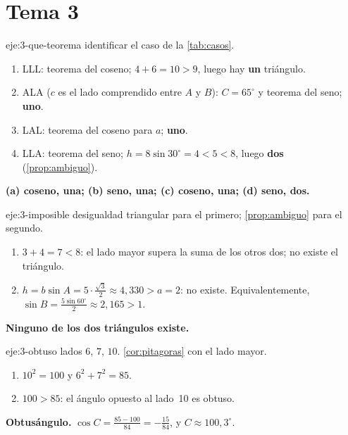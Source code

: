 \section{Tema 3}

\begin{solucion}{eje:3-que-teorema}
\planteamiento identificar el caso de la \cref{tab:casos}.
\pasos
\begin{enumerate}[label=(\alph*)]
  \item LLL: teorema del coseno; $4+6=10>9$, luego hay \textbf{un} triángulo.
  \item ALA ($c$ es el lado comprendido entre $A$ y $B$): $C=65^{\circ}$ y teorema del seno; \textbf{uno}.
  \item LAL: teorema del coseno para $a$; \textbf{uno}.
  \item LLA: teorema del seno; $h=8\sin30^{\circ}=4<5<8$, luego \textbf{dos} (\cref{prop:ambiguo}).
\end{enumerate}
\resultado \textbf{(a) coseno, una; (b) seno, una; (c) coseno, una; (d) seno, dos.}
\end{solucion}

\begin{solucion}{eje:3-imposible}
\planteamiento desigualdad triangular para el primero; \cref{prop:ambiguo} para el segundo.
\pasos
\begin{enumerate}[label=\arabic*.]
  \item $3+4=7<8$: el lado mayor supera la suma de los otros dos; no existe el triángulo.
  \item $h=b\sin A=5\cdot\frac{\sqrt3}{2}\approx4{,}330>a=2$: no existe. Equivalentemente, $\sin B=\frac{5\sin60^{\circ}}{2}\approx2{,}165>1$.
\end{enumerate}
\resultado \textbf{Ninguno de los dos triángulos existe.}
\end{solucion}

\begin{solucion}{eje:3-obtuso}
\datos lados $6$, $7$, $10$.
\planteamiento \cref{cor:pitagoras} con el lado mayor.
\pasos
\begin{enumerate}[label=\arabic*.]
  \item $10^{2}=100$ y $6^{2}+7^{2}=85$.
  \item $100>85$: el ángulo opuesto al lado~10 es obtuso.
\end{enumerate}
\resultado \textbf{Obtusángulo.}
\comprobacion $\cos C=\frac{85-100}{84}=-\frac{15}{84}$, y $C\approx100{,}3^{\circ}$.
\end{solucion}

